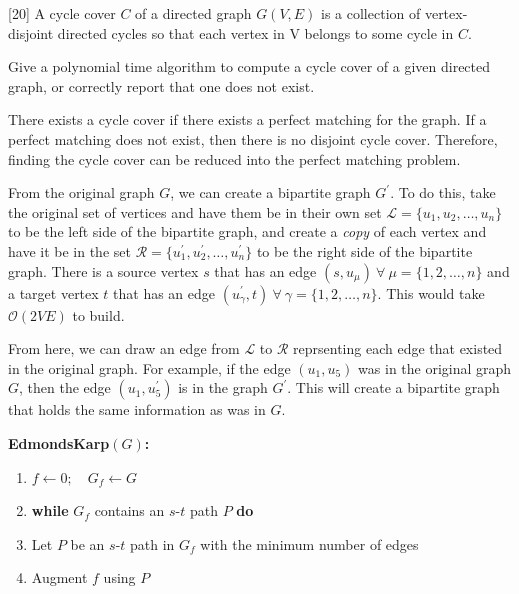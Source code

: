 \documentclass[addpoints]{exam}
\begin{document}
\begin{questions}


[20]
A cycle cover $C$ of a directed graph $G(V,E)$ is a collection of
vertex-disjoint directed cycles so that each vertex in V belongs to
some cycle in $C$.

Give a polynomial time algorithm to compute a cycle cover of a given
directed graph, or correctly report that one does not exist.

\begin{solution}
There exists a cycle cover if there exists a perfect matching for the graph. If a perfect matching does not exist, then there is no disjoint cycle cover. Therefore, finding the cycle cover can be reduced into the perfect matching problem.

From the original graph $G$, we can create a bipartite graph $G^{\prime}$. To do this, take the original set of vertices and have them be in their own set $\mathcal{L}=\{u_{1},u_{2},\ldots,u_{n}\}$ to be the left side of the bipartite graph, and create a {\em copy} of each vertex and have it be in the set $\mathcal{R}=\{u_{1}^{\prime},u_{2}^{\prime},\ldots,u_{n}^{\prime}\}$ to be the right side of the bipartite graph. There is a source vertex $s$ that has an edge $\left(s, u_{\mu}\right)\ \forall\ \mu=\{1,2,\ldots,n\}$ and a target vertex $t$ that has an edge $\left(u_{\gamma}^{\prime},t\right)\ \forall\ \gamma=\{1,2,\ldots,n\}$. This would take $\mathcal{O}(2VE)$ to build.

From here, we can draw an edge from $\mathcal{L}$ to $\mathcal{R}$ reprsenting each edge that existed in the original graph. For example, if the edge $\left(u_{1},u_{5}\right)$ was in the original graph $G$, then the edge $\left(u_{1},u_{5}^{\prime}\right)$ is in the graph $G^{\prime}$. This will create a bipartite graph that holds the same information as was in $G$.

{\bf EdmondsKarp}$(G)${\bf:}
\vspace{-1em}\begin{enumerate}
\itemsep-0.5em
\item $f\leftarrow 0;\quad G_{f}\leftarrow G$
\item {\bf while} $G_{f}$ contains an $s$-$t$ path $P$ {\bf do}

\item\hspace{3em}Let $P$ be an $s$-$t$ path in $G_{f}$ with the minimum number of edges

\item\hspace{3em}Augment $f$ using $P$


\end{enumerate}
\end{solution}
\end{questions}
\end{document}
